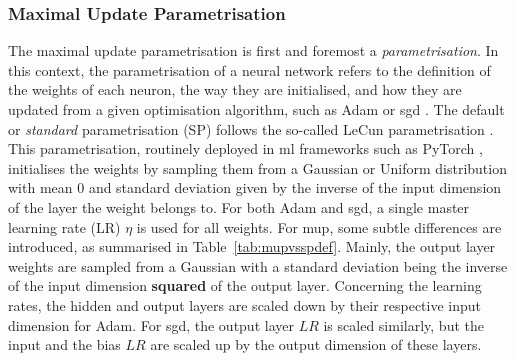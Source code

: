 \subsubsection{Maximal Update Parametrisation}
The maximal update parametrisation is first and foremost a \textit{parametrisation}. In this context, the parametrisation of a neural network refers to the definition of the weights of each neuron, the way they are initialised, and how they are updated from a given optimisation algorithm, such as Adam or \gls{sgd} \cite{adamPaper}. The default or \textit{standard} parametrisation (SP) follows the so-called LeCun parametrisation \cite{LeCun2012}. This parametrisation, routinely deployed in \gls{ml} frameworks such as PyTorch \cite{pytorch}, initialises the weights by sampling them from a Gaussian or Uniform distribution with mean 0 and standard deviation given by the inverse of the input dimension of the layer the weight belongs to. For both Adam and \gls{sgd}, a single master learning rate (LR) $\eta$ is used for all weights. For \gls{mup}, some subtle differences are introduced, as summarised in Table~\ref{tab:mupvsspdef}. Mainly, the output layer weights are sampled from a Gaussian with a standard deviation being the inverse of the input dimension \textbf{squared} of the output layer. Concerning the learning rates, the hidden and output layers are scaled down by their respective input dimension for Adam. For \gls{sgd}, the output layer $LR$ is scaled similarly, but the input and the bias $LR$ are scaled up by the output dimension of these layers. 

